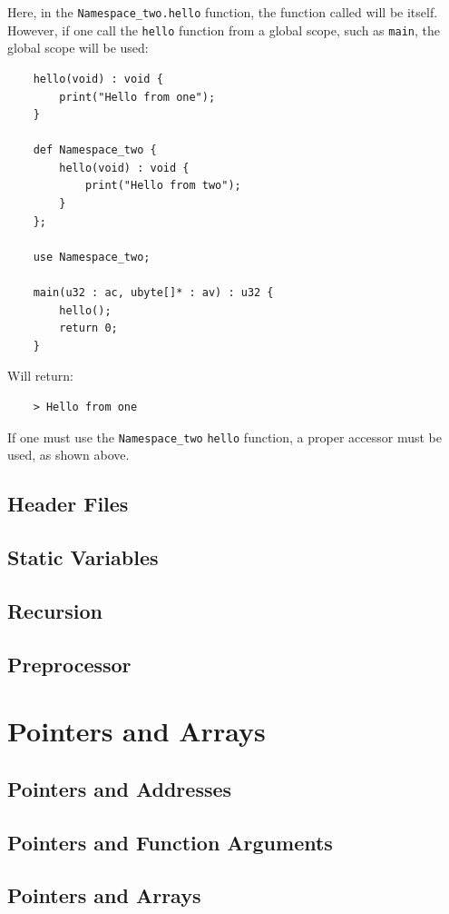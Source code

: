 \documentclass{scrartcl}
\begin{document}
            Here, in the \texttt{Namespace\_two.hello} function, the function
            called will be itself. However, if one call the \texttt{hello} function
            from a global scope, such as \texttt{main}, the global scope will be used:
            \begin{lstlisting}
    hello(void) : void {
        print("Hello from one");
    }

    def Namespace_two {
        hello(void) : void {
            print("Hello from two");
        }
    };

    use Namespace_two;

    main(u32 : ac, ubyte[]* : av) : u32 {
        hello();
        return 0;
    }
            \end{lstlisting}
    Will return:
            \begin{lstlisting}
    > Hello from one
            \end{lstlisting}
            If one must use the \texttt{Namespace\_two} \texttt{hello} function,
            a proper accessor must be used, as shown above.



        \subsection{Header Files}
        \subsection{Static Variables}
        \subsection{Recursion}
        \subsection{Preprocessor}
    \section{Pointers and Arrays}
        \subsection{Pointers and Addresses}
        \subsection{Pointers and Function Arguments}
        \subsection{Pointers and Arrays}
\end{document}
